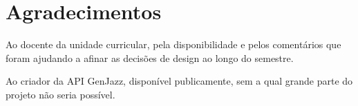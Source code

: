 \chapter*{Agradecimentos}
\label{chap:ack}

Ao docente da unidade curricular, pela disponibilidade e pelos comentários que foram ajudando a afinar as decisões de design ao longo do semestre.

Ao criador da API GenJazz, disponível publicamente, sem a qual grande parte do projeto não seria possível.
